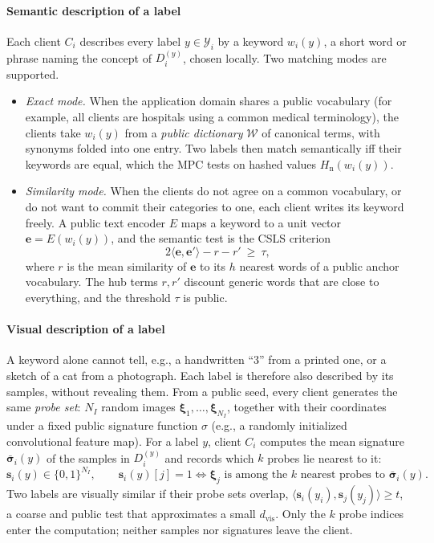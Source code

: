 \paragraph{Semantic description of a label}
Each client $C_i$ describes every label $y\in\mathcal{Y}_i$ by a keyword $w_i(y)$, a short word or
phrase naming the concept of $D_i^{(y)}$, chosen locally. Two matching modes are supported.
\begin{itemize}
  \item \emph{Exact mode.} When the application domain shares a public vocabulary (for example, all
  clients are hospitals using a common medical terminology), the clients take $w_i(y)$ from a
  \emph{public dictionary} $\mathcal{W}$ of canonical terms, with synonyms folded into one entry.
  Two labels then match semantically iff their keywords are equal, which the MPC tests on hashed
  values $H_{\mathrm{n}}(w_i(y))$.
  \item \emph{Similarity mode.} When the clients do not agree on a common vocabulary, or do not want
  to commit their categories to one, each client writes its keyword freely. A public text encoder
  $E$ maps a keyword to a unit vector $\mathbf{e}=E(w_i(y))$, and the semantic test is the CSLS
  criterion
  \begin{equation}
    2\langle\mathbf{e},\mathbf{e}'\rangle-r-r'\ \ge\ \tau ,
    \label{eq:csls}
  \end{equation}
  where $r$ is the mean similarity of $\mathbf{e}$ to its $h$ nearest words of a public anchor
  vocabulary. The hub terms $r,r'$ discount generic words that are close to everything, and the
  threshold $\tau$ is public.
\end{itemize}

\paragraph{Visual description of a label}
A keyword alone cannot tell, e.g., a handwritten ``3'' from a printed one, or a sketch of a cat from
a photograph. Each label is therefore also described by its samples, without revealing them. From a
public seed, every client generates the same \emph{probe set}: $N_I$ random images
$\boldsymbol\xi_1,\dots,\boldsymbol\xi_{N_I}$, together with their coordinates under a fixed public
signature function $\sigma$ (e.g., a randomly initialized convolutional feature map). For a label
$y$, client $C_i$ computes the mean signature $\bar{\boldsymbol\sigma}_i(y)$ of the samples in
$D_i^{(y)}$ and records which $k$ probes lie nearest to it:
\begin{equation}
  \mathbf{s}_i(y)\in\{0,1\}^{N_I},\qquad \mathbf{s}_i(y)[j]=1 \iff
  \boldsymbol\xi_j \text{ is among the $k$ nearest probes to } \bar{\boldsymbol\sigma}_i(y).
\end{equation}
Two labels are visually similar if their probe sets overlap,
$\langle\mathbf{s}_i(y_i),\mathbf{s}_j(y_j)\rangle\ge t$, a coarse and public test that approximates
a small $d_{\mathrm{vis}}$. Only the $k$ probe indices enter the computation; neither samples nor
signatures leave the client.

